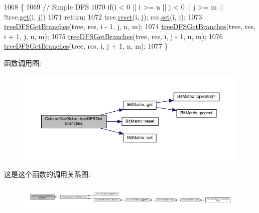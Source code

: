 \begin{DoxyCode}
1068 \{
1069     \textcolor{comment}{// Simple DFS}
1070     \textcolor{keywordflow}{if}(i < 0 || i >= n || j < 0 || j >= m || !tree.\hyperlink{classBitMatrix_ad19d1045b54ccc8a99d70d38305b4ca6}{get}(i, j)) 
1071         \textcolor{keywordflow}{return};
1072     tree.\hyperlink{classBitMatrix_a0ee870454e6343c3272ab791e45af404}{reset}(i, j); res.\hyperlink{classBitMatrix_ad26dd2e93e9d24d70834d6d79e29c81e}{set}(i, j);
1073     \hyperlink{classColumnGenSolve_a39be14a210fccecb512a754e1a359861}{treeDFSGetBranches}(tree, res, i - 1, j, n, m);
1074     \hyperlink{classColumnGenSolve_a39be14a210fccecb512a754e1a359861}{treeDFSGetBranches}(tree, res, i + 1, j, n, m);
1075     \hyperlink{classColumnGenSolve_a39be14a210fccecb512a754e1a359861}{treeDFSGetBranches}(tree, res, i, j - 1, n, m);
1076     \hyperlink{classColumnGenSolve_a39be14a210fccecb512a754e1a359861}{treeDFSGetBranches}(tree, res, i, j + 1, n, m);
1077 \}
\end{DoxyCode}


函数调用图\+:
\nopagebreak
\begin{figure}[H]
\begin{center}
\leavevmode
\includegraphics[width=350pt]{classColumnGenSolve_a39be14a210fccecb512a754e1a359861_cgraph}
\end{center}
\end{figure}




这是这个函数的调用关系图\+:
\nopagebreak
\begin{figure}[H]
\begin{center}
\leavevmode
\includegraphics[width=350pt]{classColumnGenSolve_a39be14a210fccecb512a754e1a359861_icgraph}
\end{center}
\end{figure}



